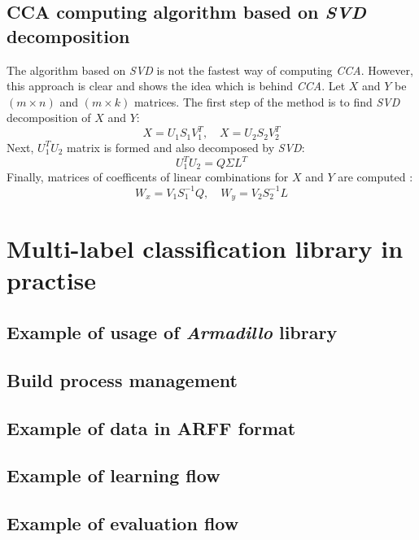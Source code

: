 \begin{appendices}
\newpage
\section{CCA computing algorithm based on \textit{SVD} decomposition}
\label{app:cca}

The algorithm based on \textit{SVD} is not the fastest way of computing \textit{CCA}. However, this approach is clear and shows the idea which is behind \textit{CCA}. Let $X$ and $Y$ be $(m \times n)$ and $(m \times k)$ matrices. The first step of the method is to find \textit{SVD} decomposition of $X$ and $Y$:
\begin{equation}
    X=U_1S_1V^T_1, \quad X=U_2S_2V^T_2
\end{equation}
Next, $U_1^TU_2$ matrix is formed and also decomposed by \textit{SVD}:
\begin{equation}
    U_1^TU_2 = Q\Sigma{L^T}
\end{equation}
Finally, matrices of coefficents of linear combinations for $X$ and $Y$ are computed \cite{William}:
\begin{equation}
    W_x=V_1S_1^{-1}Q, \quad  W_y=V_2S_2^{-1}L
\end{equation}


\chapter{Multi-label classification library in practise}
\section{Example of usage of \textit{Armadillo} library}
\label{app:arma}


\newpage
\section{Build process management}
\label{app:build}

\newpage
\section{Example of data in ARFF format}
\label{app:arff}



\newpage
\label{app:learning}
\section{Example of learning flow}


\newpage
\label{app:evaluating}
\section{Example of evaluation flow}


\end{appendices}
